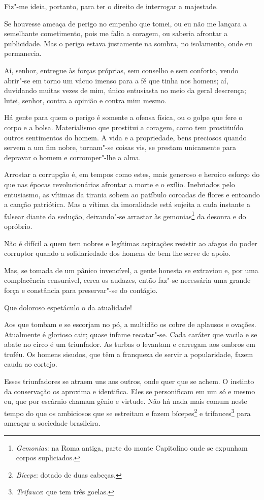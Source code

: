 \begin{linenumbers}
 Fiz"-me ideia, portanto, para ter o direito de interrogar a majestade.

 Se houvesse ameaça de perigo no empenho que tomei, ou eu não me lançara
a semelhante cometimento, pois me falia a coragem, ou saberia afrontar
a publicidade. Mas o perigo estava justamente na sombra, no isolamento,
onde eu permanecia. 

 Aí, senhor, entregue às forças próprias, sem conselho e sem conforto,
vendo abrir"-se em torno um vácuo imenso para a fé que tinha nos
homens; aí, duvidando muitas vezes de mim, único entusiasta no meio da
geral descrença; lutei, senhor, contra a opinião e contra mim mesmo. 

 Há gente para quem o perigo é somente a ofensa física, ou o golpe que
fere o corpo e a bolsa. Materialismo que prostitui a coragem, como tem
prostituído outros sentimentos do homem. A vida e a propriedade, bens
preciosos quando servem a um fim nobre, tornam"-se coisas vis, se
prestam unicamente para depravar o homem e corromper"-lhe a alma. 

 Arrostar a corrupção é, em tempos como estes, mais generoso e heroico
esforço do que nas épocas revolucionárias afrontar a morte e o exílio.
Inebriados pelo entusiasmo, as vítimas da tirania sobem ao patíbulo
coroadas de flores e entoando a canção patriótica. Mas a vítima da
imoralidade está sujeita a cada instante a falsear diante da sedução,
deixando"-se arrastar às
gemonias\footnote{ \textit{Gemonias}: na Roma antiga, parte do monte Capitolino onde se expunham
corpos supliciados.} da desonra e do opróbrio. 

 Não é difícil a quem tem nobres e legítimas aspirações resistir ao
afagos do poder corruptor quando a solidariedade dos homens de bem lhe
serve de apoio. 

 Mas, se tomada de um pânico invencível, a gente honesta se extraviou e,
por uma complacência censurável, cerca os audazes, então faz"-se
necessária uma grande força e constância para preservar"-se do contágio. 

 Que doloroso espetáculo o da atualidade!

 Aos que tombam e se escorjam no pó, a multidão os cobre de aplausos e
ovações. Atualmente é glorioso cair; quase infame recatar"-se. Cada
caráter que vacila e se abate no circo é um triunfador. As turbas o
levantam e carregam aos ombros em troféu. Os homens sisudos, que têm a
franqueza de servir a popularidade, fazem cauda ao cortejo. 

 Esses triunfadores se atraem uns aos outros, onde quer que se achem. O
instinto da conservação os aproxima e identifica. Eles se personificam
em um só e mesmo eu, que por escárnio chamam gênio e virtude. Não há
nada mais comum neste tempo do que os ambiciosos que se estreitam e
fazem bícepes\footnote{ \textit{Bícepe}: dotado de duas cabeças.}
 e trifauces\footnote{ \textit{Trifauce}: que tem três goelas.}
 para ameaçar a sociedade brasileira. 


\end{linenumbers}
